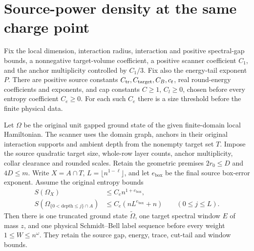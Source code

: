 \section{Source-power density at the same charge point}
\label{sec:arealaw-source-selected-density}

\begin{lemma}
    \label{thm:arealaw-source-selected-sharp-density}
    \leanok
    Fix the local dimension, interaction radius, interaction and positive
    spectral-gap bounds, a nonnegative target-volume coefficient, a positive
    scanner coefficient $C_1$, and the anchor multiplicity controlled by
    $C_1/3$.  Fix also the energy-tail exponent $P$.
    There are positive source constants $C_{\rm tr},C_{\rm target},C_B,c_t$,
    real round-energy coefficients and exponents, and cap constants
    $C\geq1$, $C_l\geq0$, chosen before every entropy coefficient $C_e\geq0$.  For each such $C_e$
    there is a size threshold before the finite physical data.

    Let $\Omega$ be the original unit gapped ground state of the given
    finite-domain local Hamiltonian.  The scanner uses the domain
    graph, anchors in their original interaction supports and ambient depth
    from the nonempty target set $T$.  Impose the source quadratic target
    size, whole-row layer counts, anchor multiplicity, collar clearance and
    rounded scales.  Retain the geometric premises
    $2r_0\leq D$ and $4D\leq m$.  Write
    $X=A\cap T$, $L=\lfloor n^{1-\ell}\rfloor$, and let $e_{\mathrm{box}}$
    be the final source box-error exponent.  Assume the original entropy bounds
    \begin{align}
        S(\Omega_X) & \leq C_en^{1+e_{\mathrm{box}}},\nonumber                \\
        S(\Omega_{\{0<\mathrm{depth}\leq j\}\cap A})
                    & \leq C_e(nL^{e_{\mathrm{box}}}+n)\qquad(0\leq j\leq L).
    \end{align}
    Then there is one truncated ground state $\widetilde\Omega$, one
    target spectral window $E$ of mass $z$, and one physical Schmidt--Bell
    label sequence before every weight $1\leq W\leq n^\omega$.
    They retain the source gap, energy, trace, cut-tail and window bounds.


\end{lemma}
